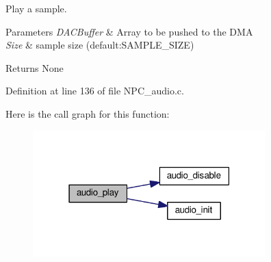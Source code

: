 Play a sample. 


\begin{DoxyParams}{Parameters}
{\em D\+A\+C\+Buffer} & Array to be pushed to the D\+MA \\
\hline
{\em Size} & sample size (default\+:S\+A\+M\+P\+L\+E\+\_\+\+S\+I\+ZE) \\
\hline
\end{DoxyParams}
\begin{DoxyReturn}{Returns}
None 
\end{DoxyReturn}


Definition at line 136 of file N\+P\+C\+\_\+audio.\+c.



Here is the call graph for this function\+:\nopagebreak
\begin{figure}[H]
\begin{center}
\leavevmode
\includegraphics[width=255pt]{de/d72/group___audio___play_gaf73a37418a80bbb39f75abe8b60b0afb_cgraph}
\end{center}
\end{figure}


